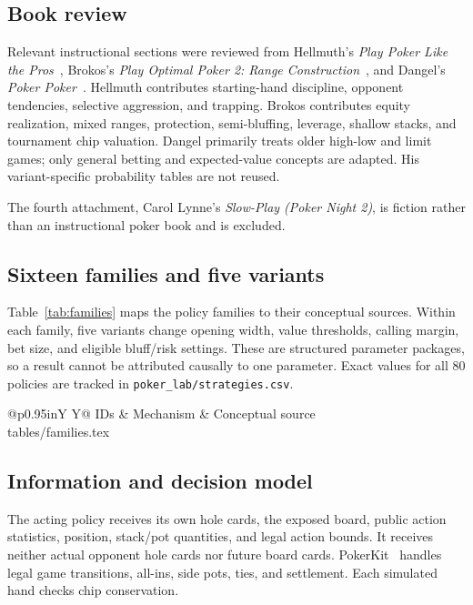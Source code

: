 \documentclass[11pt,letterpaper]{article}
\makeatletter
\newcommand{\inputtable}[1]{\@@input #1 }
\makeatother
\begin{document}
\subsection{Book review}
Relevant instructional sections were reviewed from Hellmuth's
\emph{Play Poker Like the Pros}~\cite{hellmuth}, Brokos's \emph{Play Optimal
Poker 2: Range Construction}~\cite{brokos}, and Dangel's \emph{Poker
Poker}~\cite{dangel}. Hellmuth contributes starting-hand discipline,
opponent tendencies, selective aggression, and trapping. Brokos contributes
equity realization, mixed ranges, protection, semi-bluffing, leverage,
shallow stacks, and tournament chip valuation. Dangel primarily treats older
high-low and limit games; only general betting and expected-value concepts
are adapted. His variant-specific probability tables are not reused.

The fourth attachment, Carol Lynne's \emph{Slow-Play (Poker Night 2)}, is
fiction rather than an instructional poker book and is excluded.

\subsection{Sixteen families and five variants}
Table~\ref{tab:families} maps the policy families to their conceptual
sources. Within each family, five variants change opening width, value
thresholds, calling margin, bet size, and eligible bluff/risk settings.
These are structured parameter packages, so a result cannot be attributed
causally to one parameter. Exact values for all 80 policies are tracked in
\texttt{poker\_lab/strategies.csv}.

\begin{table}[htbp]
\centering\small
\caption{Policy families. Attribution is conceptual; numerical settings are original experimental choices.}
\label{tab:families}
\begin{tabularx}{\linewidth}{@{}p{0.95in}Y Y@{}}
\toprule IDs & Mechanism & Conceptual source \\\midrule
\inputtable{tables/families.tex}
\bottomrule
\end{tabularx}
\end{table}

\subsection{Information and decision model}
The acting policy receives its own hole cards, the exposed board, public
action statistics, position, stack/pot quantities, and legal action bounds.
It receives neither actual opponent hole cards nor future board cards.
PokerKit~\cite{pokerkit} handles legal game transitions, all-ins, side pots,
ties, and settlement. Each simulated hand checks chip conservation.
\end{document}
